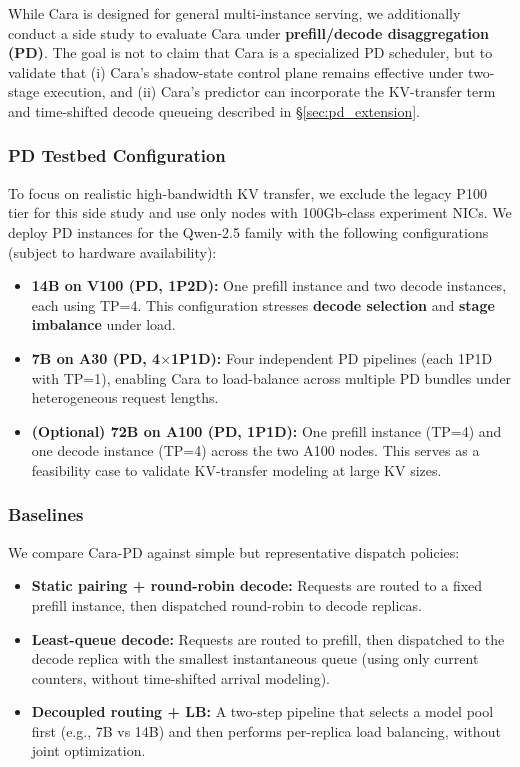 \documentclass[letterpaper, anonymous, twocolumn, 10pt]{article}
\begin{document}
While Cara is designed for general multi-instance serving, we additionally conduct a side study to evaluate Cara under \textbf{prefill/decode disaggregation (PD)}. The goal is not to claim that Cara is a specialized PD scheduler, but to validate that (i) Cara's shadow-state control plane remains effective under two-stage execution, and (ii) Cara's predictor can incorporate the KV-transfer term and time-shifted decode queueing described in \S\ref{sec:pd_extension}.

\subsubsection{PD Testbed Configuration}
To focus on realistic high-bandwidth KV transfer, we exclude the legacy P100 tier for this side study and use only nodes with 100Gb-class experiment NICs. We deploy PD instances for the Qwen-2.5 family with the following configurations (subject to hardware availability):
\begin{itemize}
    \item \textbf{14B on V100 (PD, 1P2D):} One prefill instance and two decode instances, each using TP=4. This configuration stresses \textbf{decode selection} and \textbf{stage imbalance} under load.
    \item \textbf{7B on A30 (PD, 4$\times$1P1D):} Four independent PD pipelines (each 1P1D with TP=1), enabling Cara to load-balance across multiple PD bundles under heterogeneous request lengths.
    \item \textbf{(Optional) 72B on A100 (PD, 1P1D):} One prefill instance (TP=4) and one decode instance (TP=4) across the two A100 nodes. This serves as a feasibility case to validate KV-transfer modeling at large KV sizes.
\end{itemize}

\subsubsection{Baselines}
We compare Cara-PD against simple but representative dispatch policies:
\begin{itemize}
    \item \textbf{Static pairing + round-robin decode:} Requests are routed to a fixed prefill instance, then dispatched round-robin to decode replicas.
    \item \textbf{Least-queue decode:} Requests are routed to prefill, then dispatched to the decode replica with the smallest instantaneous queue (using only current counters, without time-shifted arrival modeling).
    \item \textbf{Decoupled routing + LB:} A two-step pipeline that selects a model pool first (e.g., 7B vs 14B) and then performs per-replica load balancing, without joint optimization.
\end{itemize}
\end{document}
